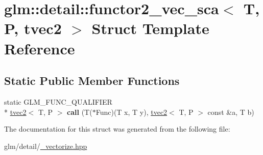 \hypertarget{structglm_1_1detail_1_1functor2__vec__sca_3_01T_00_01P_00_01tvec2_01_4}{\section{glm\-:\-:detail\-:\-:functor2\-\_\-vec\-\_\-sca$<$ T, P, tvec2 $>$ Struct Template Reference}
\label{structglm_1_1detail_1_1functor2__vec__sca_3_01T_00_01P_00_01tvec2_01_4}
}
\subsection*{Static Public Member Functions}
\begin{DoxyCompactItemize}
\item 
\hypertarget{structglm_1_1detail_1_1functor2__vec__sca_3_01T_00_01P_00_01tvec2_01_4_ad640cc49fdd9c6451bff02195a618c55}{static G\-L\-M\-\_\-\-F\-U\-N\-C\-\_\-\-Q\-U\-A\-L\-I\-F\-I\-E\-R \\*
\hyperlink{structglm_1_1tvec2}{tvec2}$<$ T, P $>$ {\bfseries call} (T($\ast$Func)(T x, T y), \hyperlink{structglm_1_1tvec2}{tvec2}$<$ T, P $>$ const \&a, T b)}\label{structglm_1_1detail_1_1functor2__vec__sca_3_01T_00_01P_00_01tvec2_01_4_ad640cc49fdd9c6451bff02195a618c55}

\end{DoxyCompactItemize}


The documentation for this struct was generated from the following file\-:\begin{DoxyCompactItemize}
\item 
glm/detail/\hyperlink{__vectorize_8hpp}{\-\_\-vectorize.\-hpp}\end{DoxyCompactItemize}
